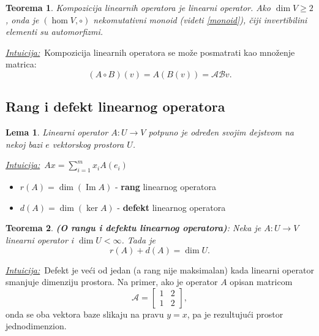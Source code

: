 \documentclass[a4paper,12pt,twoside]{report}
\newtheorem{theorem}{Teorema}[section]
\newtheorem{lemma}{Lema}[section]
\numberwithin{algorithm}{section}
\newcommand{\intuicija}{\noindent\underline{\textit{Intuicija:}}\ }
\begin{document}
\begin{theorem}
    Kompozicija linearnih operatora je linearni operator. Ako $\dim V\geq2$, onda je $(\hom V, \circ)$ nekomutativni monoid (videti \ref{monoid}), čiji invertibilini
    elementi su automorfizmi.
\end{theorem}
\intuicija Kompozicija linearnih operatora se može posmatrati kao množenje matrica:
\[ (A\circ B)(v) = A(B(v)) = \mathcal{AB}v. \]

\subsection{Rang i defekt linearnog operatora}

\begin{lemma}
    \label{OdredjenostLinearnogOperatora}
    Linearni operator $A:U \to V$ potpuno je određen svojim dejstvom na nekoj bazi $e$ vektorskog prostora $U$.
\end{lemma}
\intuicija $\displaystyle Ax = \sum_{i=1}^{m}x_iA(e_i)$

\begin{itemize}
    \item $r(A) = \dim (\operatorname{Im} A)$ - \textbf{rang} linearnog operatora
    \item $d(A) = \dim (\ker A)$ - \textbf{defekt} linearnog operatora
\end{itemize}
\newpage 
\begin{theorem} \label{teoremaRangDefekt}
    \textbf{(O rangu i defektu linearnog operatora)}: Neka je $A: U \to V$ linearni operator i $\dim U < \infty$. Tada je 
    \[ r(A) + d(A) = \dim U.\]
\end{theorem}
\vfill
\intuicija Defekt je veći od jedan (a rang nije maksimalan) kada linearni operator smanjuje dimenziju prostora. Na primer, ako je operator $A$ opisan 
matricom \[\mathcal{A} = \begin{bmatrix}
    1 & 2 \\
    1 & 2
\end{bmatrix},\] onda se oba vektora baze slikaju na pravu $y = x$, pa je rezultujući prostor jednodimenzion. 
\end{document}
